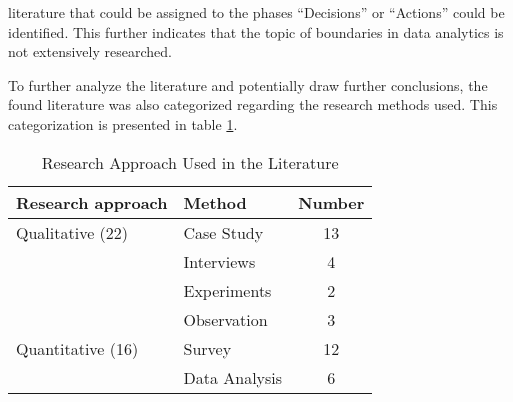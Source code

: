 literature that could be assigned to the phases \enquote{Decisions} or \enquote{Actions} could be identified. This further indicates that the topic of boundaries in data analytics is not extensively researched.

To further analyze the literature and potentially draw further conclusions, the found literature was also categorized regarding the research methods used. This categorization is presented in table \ref{researchMethod}.

\begin{table}[htbp]
    \centering
    \small
    \begin{tabular}{llc}
    \hline
    \multicolumn{1}{l}{Research approach} & \multicolumn{1}{l}{Method} & \multicolumn{1}{l}{Number} \\ \hline
    Qualitative (22)                      & Case Study                 & 13                         \\
                                          & Interviews                 & 4                          \\
                                          & Experiments                & 2                          \\
                                          & Observation                & 3                          \\
    Quantitative (16)                     & Survey                     & 12                         \\
                                          & Data Analysis              & 6                          \\ \hline
    \end{tabular}
    \caption{Research Approach Used in the Literature}
    \label{researchMethod}
    \end{table}

